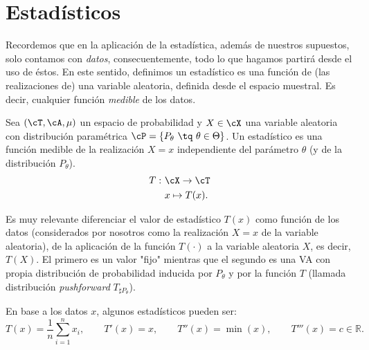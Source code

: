 \chapter{Estadísticos}

Recordemos que en la aplicación de la estadística, además de nuestros supuestos, solo contamos con \emph{datos}, consecuentemente, todo lo que hagamos partirá desde el uso de éstos. En este sentido, definimos un estadístico es una función de (las realizaciones de) una variable aleatoria, definida desde el espacio muestral. Es decir, cualquier función \emph{medible} de los datos.\\ 

\begin{definition}[Estadístico]
\label{def:estadístico}
Sea $(\cT,\cA,\mu)$ un espacio de probabilidad y $X\in\cX$ una variable aleatoria con distribución paramétrica $\cP = \{P_\theta\ \tq\ \theta\in\Theta\}$. Un estadístico es una función medible de la realización $X=x$ independiente del parámetro $\theta$ (y de la distribución $P_\theta$).
\begin{align}
\nonumber
	T:\ &\cX \rightarrow \cT\\
\nonumber
	&x\mapsto T(x).
\end{align} 

\end{definition}

\begin{remark}
Es muy relevante diferenciar el valor de estadístico $T(x)$ como función de los datos (considerados por nosotros como la realización $X=x$ de la variable aleatoria), de la aplicación de la función $T(\cdot)$ a la variable aleatoria $X$, es decir, $T(X)$. El primero es un valor "fijo" mientras que el segundo es una VA con propia distribución de probabilidad inducida por $P_\theta$ y por la función $T$ (llamada distribución \emph{pushforward} $T_{\sharp P_\theta}$).\\ 
\end{remark}


En base a los datos $x$, algunos estadísticos pueden ser: 
\begin{equation}
\nonumber
	T(x) = \frac{1}{n}\sum_{i=1}^nx_i,\qquad T'(x) = x, \qquad T''(x) = \min(x), \qquad T'''(x) = c\in \mathbb{R}.
\end{equation}

